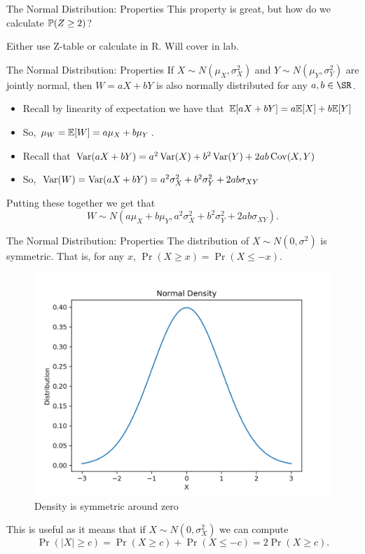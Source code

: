 \documentclass[notheorems,9pt]{beamer}
\begin{document}
\begin{frame}{The Normal Distribution: Properties} 
	\label{frame:nd-properties2}
	 This property is great, but how do we calculate \(\P(Z\geq 2)\)?	

	 Either use Z-table or calculate in R. Will cover in lab. 
\end{frame}
\begin{frame}{The Normal Distribution: Properties} 
	\label{frame:nd-properties3}
	 If \(X\sim N(\mu_X,\sigma_X^2)\) and \(Y\sim N(\mu_Y,\sigma_Y^2)\) are jointly normal, then \(W=aX+bY\) is also normally distributed for any \(a,b\in\SR\).

	\begin{itemize}
		\item Recall by linearity of expectation we have that \(\E[aX+bY] = a\E[X]+ b\E[Y]\)
		\item So, \(\mu_W = \E[W] = a\mu_X + b\mu_Y\).
	\end{itemize}
	\begin{itemize}
		\item Recall that \(\Var(aX+bY) = a^2\Var(X) + b^2\Var(Y) + 2ab\Cov(X,Y)\)
		\item So, \(\Var(W) = \Var(aX+bY) = a^2\sigma_X^2 + b^2\sigma_Y^2 + 2ab\sigma_{XY}\)
	\end{itemize}
	Putting these together we get that
	\[
		W\sim N\left(a\mu_X + b\mu_Y, a^2\sigma_X^2 + b^2\sigma_Y^2 + 2ab\sigma_{XY}\right)
	.\] 
\end{frame}
\begin{frame}{The Normal Distribution: Properties} 
	\label{frame:symmetry}
	 The distribution of \(X \sim N(0,\sigma^2)\) is symmetric. That is, for any \(x\), \(\Pr(X \geq x) = \Pr(X \leq -x)\).
	\begin{figure}[htpb]
		\centering
		\includegraphics[width=0.50\linewidth]{normal-density-standard.png}
		\caption{Density is symmetric around zero}%
	\end{figure}
	This is useful as it means that if \(X \sim N(0,\sigma_X^2)\) we can compute
	 \[
		 \Pr(|X|\geq c) = \Pr(X\geq c) + \Pr(X \leq -c) = 2\Pr(X\geq c)
	.\] 
\end{frame}
\end{document}
